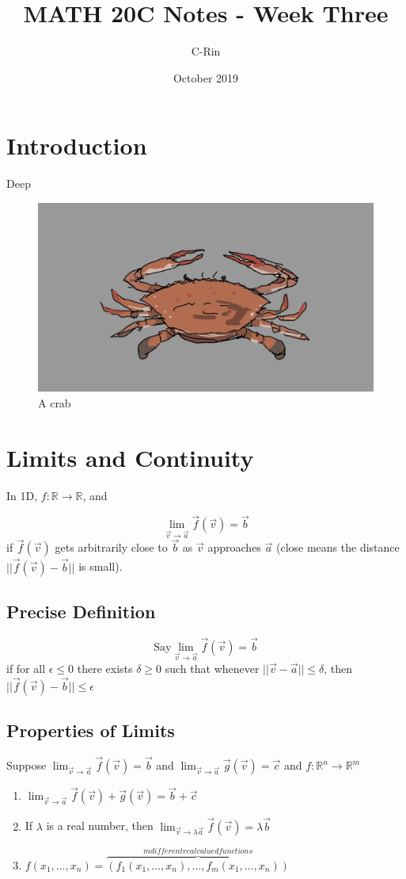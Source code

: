 \documentclass{article}
\title{MATH 20C Notes - Week Three}
\author{C-Rin}
\date{October 2019}
\begin{document}
\maketitle

\section*{Introduction}
Deep 

\begin{figure}[h!]
\centering
\includegraphics[scale=0.09]{crab.jpg}
\caption{A crab}
\end{figure}

\section{Limits and Continuity}
In 1D, $f: \mathbb{R}\rightarrow\mathbb{R}$, and 

\[\lim_{\vec{v}\rightarrow\vec{a}}\vec{f}(\vec{v})=\vec{b}\]
if $\vec{f}(\vec{v})$ gets arbitrarily close to $\vec{b}$ as $\vec{v}$ approaches $\vec{a}$ (close means the distance $||\vec{f}(\vec{v})-\vec{b}||$ is small).

\subsection{Precise Definition}
\[\mbox{Say}\lim_{\vec{v}\rightarrow\vec{a}}\vec{f}(\vec{v})=\vec{b}\]
if for all $\epsilon\leq 0$ there exists $\delta\ge 0$ such that whenever $||\vec{v}-\vec{a}||\le\delta$, then $||\vec{f}(\vec{v})-\vec{b}||\le\epsilon$

\subsection{Properties of Limits}
Suppose $\lim_{\vec{v}\rightarrow\vec{a}}\vec{f}(\vec{v})=\vec{b}$ and $\lim_{\vec{v}\rightarrow\vec{a}}\vec{g}(\vec{v})=\vec{c}$ and $f:\mathbb{R}^n\rightarrow\mathbb{R}^m$
\begin{enumerate}
    \item $\lim_{\vec{v}\rightarrow\vec{a}}\vec{f}(\vec{v})+\vec{g}(\vec{v})=\vec{b}+\vec{c}$
    \item If $\lambda$ is a real number, then $\lim_{\vec{v}\rightarrow\lambda\vec{a}}\vec{f}(\vec{v})=\lambda\vec{b}$
    \item $f(x_1,\ldots,x_n)=\overbrace{(f_{1}(x_1,\ldots,x_n),\ldots,f_{m}(x_1,\ldots,x_n))}^{m different real valued functions}$
\end{enumerate}
\end{document}
